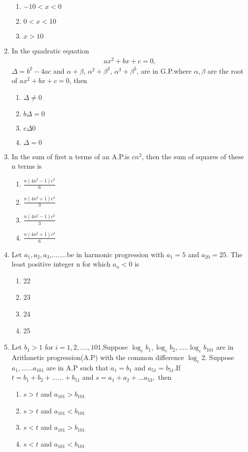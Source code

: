 \begin{enumerate}[label=\arabic*.,ref=\thesubsection.\theenumi]
\begin{enumerate}
\item $-10<x<0$ 
\item $0<x<10$ 
\item $x>10$
\end{enumerate}
\item In the quadratic equation 
\begin{align}
ax^2+bx+c=0,
\end{align} $\Delta =b^2-4ac$ and $\alpha+\beta$, $\alpha^2+\beta^2$, $\alpha^3+\beta^3$, are in G.P.where $\alpha, \beta$ are the root of $ax^2+bx+c=0$, then 
\begin{enumerate}
\item $\Delta\neq0$
\item $b\Delta=0$ 
\item $c\Delta0$ 
\item $\Delta=0$
\end{enumerate}
\item In the sum of first n terms of an A.P.is $cn^2$, then the sum of squares of these n terms is
\begin{enumerate}
\item $\frac{n(4n^2-1)c^2}{6}$ 
\item $\frac{n(4n^2+1)c^2}{3}$ 
\item $\frac{n(4n^2-1)c^2}{3}$ 
\item $\frac{n(4n^2+1)c^2}{6}$
\end{enumerate}
\item Let $a_1,a_2,a_3$,........be in harmonic progression with $a_1=5$ and $a_{20}=25$. The least positive integer n for which $a_n<0$ is
\begin{enumerate}
\item 22 
\item 23 
\item 24 
\item 25
\end{enumerate}
\item Let $b_1>1$ for $i=1,2,....,101.$Suppose $\log_e b_1,\log_e b_2,.....\log_e b_{101}$ are in Arithmetic progression(A.P) with the common difference $\log_e 2$. Suppose $a_1,......a_{101}$ are in A.P such that $a_1=b_1$ and $a_{51}=b_{51}$.If $t=b_1+b_2+......+b_{51}$ and $s=a_1+a_2+...a_{53},$ then 
\begin{enumerate}
\item $s>t$ and $a_{101}>b_{101}$
\item $s>t$ and $a_{101}<b_{101}$
\item $s<t$ and $a_{101}>b_{101}$
\item $s<t$ and $a_{101}<b_{101}$
\end{enumerate}


\end{enumerate}
